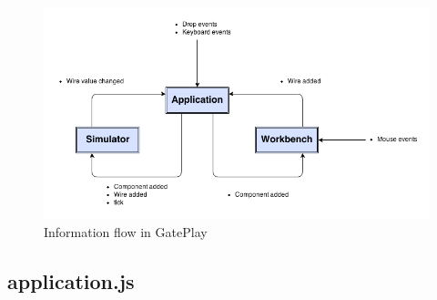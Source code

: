\begin{figure}[p]
    \centering
    \includegraphics[width=\textwidth]{application.png}
    \caption{Information flow in GatePlay}
    \label{fig:application}
\end{figure}


\subsection{application.js}
